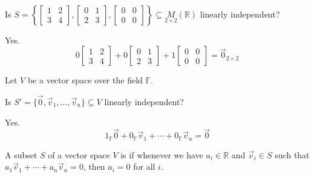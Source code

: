 \documentclass[11pt,fleqn]{book} %
\begin{document}
\begin{example}
{~~~}

    Is $S = \left\{ \begin{bmatrix} 1&2\\3&4 \end{bmatrix}, \begin{bmatrix} 0&1\\2&3 \end{bmatrix}, \begin{bmatrix} 0&0\\0&0 \end{bmatrix} \right\} \subseteq \underset{2\times2}{M}(\mathbb{R})$ linearly independent?

    {\color{lightblue} Yes. $$0 \begin{bmatrix} 1&2\\3&4 \end{bmatrix} + 0 \begin{bmatrix} 0&1\\2&3 \end{bmatrix} + 1 \begin{bmatrix} 0&0\\0&0 \end{bmatrix} = \vec{0}_{2\times2}$$ }
\end{example}

\begin{example}
    Let $V$ be a vector space over the field $\mathbb{F}$.

    Is $S' = \{\vec{0}, \vec{v}_1, \dots, \vec{v}_n\} \subseteq V$ linearly independent?

    {\color{lightblue} Yes. $$1_{\mathbb{F}}\vec{0} + 0_{\mathbb{F}}\vec{v}_1 + \cdots + 0_{\mathbb{F}}\vec{v}_n = \vec{0}$$ }
\end{example}

\setcounter{section}{4}
\setcounter{definitionT}{3}
\begin{definition}
    A subset $S$ of a vector space $V$ is  if whenever we have $a_i \in \mathbb{R}$ and $\vec{v}_i \in S$ such that $a_1\vec{v}_1 + \cdots + a_n\vec{v}_n = 0$, then $a_i = 0$ for all $i$.
\end{definition}
\setcounter{section}{5}
\end{document}
